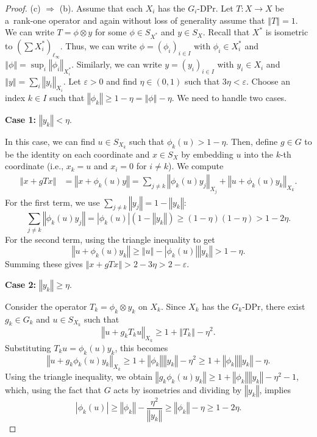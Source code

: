 \documentclass[10pt,a4paper]{amsart}
\newcommand{\abs}[1]{\left\vert#1\right\vert}
\newcommand{\e}{\varepsilon}
\newcommand{\eps}{\e}
\newcommand{\norm}[1]{\left\Vert#1\right\Vert}
\begin{document}
\begin{proof}
		\noindent
		(c) $\Rightarrow$ (b). Assume that each $X_i$ has the $G_i$-DPr. Let $T: X \to X$ be a~rank-one operator and again without loss of generality assume that $\norm{T} = 1$. We can write $T = \phi \otimes y$ for some $\phi \in S_{X^*}$ and $y \in S_X$.
		Recall that $X^*$ is isometric to $(\sum X_i^*)_{\ell_\infty}$.
		Thus, we can write $\phi = (\phi_i)_{i \in I}$ with $\phi_i \in X_i^*$ and $\norm{\phi} = \sup_i \norm{\phi_i}_{X_i^*}$.
		Similarly, we can write $y = (y_i)_{i \in I}$ with $y_i \in X_i$ and $\norm{y} = \sum_i \norm{y_i}_{X_i}$.
		Let $\eps > 0$ and find $\eta \in (0, 1)$ such that $3\eta < \eps$. Choose an index $k \in I$ such that $\norm{\phi_k} \ge 1 - \eta = \norm{\phi} - \eta$.
		We need to handle two cases.
		
		\noindent
		\textbf{Case 1:} $\norm{y_k} < \eta$.
		
		In this case, we can find $u \in S_{X_k}$ such that $\phi_k(u) > 1 - \eta$. Then, define $g \in G$ to be the identity on each coordinate and $x \in S_X$ by embedding $u$ into the $k$-th coordinate (i.e., $x_k=u$ and $x_i=0$ for $i \neq k$). We compute
		\begin{align*}
			\norm{x + gTx}
			&= \norm{x + \phi_k(u)y} 
			= \sum_{j \neq k} \norm{\phi_k(u) y_j}_{X_j} + \norm{u + \phi_k(u) y_k}_{X_k}.
		\end{align*}
		For the first term, we use $\sum_{j \neq k} \norm{y_j} = 1 - \norm{y_k}$:
		\[
		\sum_{j \neq k} \norm{\phi_k(u) y_j} = \abs{\phi_k(u)} (1 - \norm{y_k}) \ge (1-\eta)(1-\eta) > 1 - 2\eta.
		\]
		For the second term, using the triangle inequality to get
		\[
		\norm{u + \phi_k(u) y_k} \ge \norm{u} - \abs{\phi_k(u)}\norm{y_k} > 1 - \eta.
		\]
		Summing these gives $\norm{x + gTx} > 2 - 3\eta > 2 - \eps$.
		
		
		\noindent
		\textbf{Case 2:} $\norm{y_k} \ge \eta$.
		
		Consider the operator $T_k = \phi_k \otimes y_k$ on $X_k$.
		Since $X_k$ has the $G_k$-DPr, there exist $g_k \in G_k$ and $u \in S_{X_k}$ such that
		\[
		\norm{u + g_k T_k u}_{X_k} \ge 1 + \norm{T_k} - \eta^2.
		\]
		Substituting $T_k u = \phi_k(u)y_k$, this becomes
		\begin{equation} \label{eq:comp_k}
			\norm{u + g_k \phi_k(u) y_k}_{X_k}
			\ge 1 + \norm{\phi_k}\norm{y_k} - \eta^2
			\ge1 + \norm{\phi_k}\norm{y_k} - \eta.
		\end{equation}
		Using the triangle inequality, we obtain $\norm{g_k\phi_k(u)y_k} \ge 1 + \norm{\phi_k}\norm{y_k} - \eta^2 - 1$, which, using the fact that $G$ acts by isometries and dividing by $\norm{y_k}$, implies
		\begin{equation*}
			\abs{\phi_k(u)}
			\ge \norm{\phi_k} - \frac{\eta^2}{\norm{y_k}}
			\ge \norm{\phi_k} - \eta
			\ge 1 - 2\eta.
		\end{equation*}
		

\end{proof}
\end{document}
